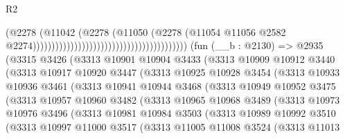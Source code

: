 \begin{lexlean}{R2}
\begin{coremodule}
                                                                          (@2278
                                                                            (@11042
                                                                              (@2278
                                                                                (@11050
                                                                                  (@2278
                                                                                    (@11054
                                                                                      @11056
                                                                                      @2582
                                                                                      @2274)))))))))))))))))))))))))))))))))))))))))
    (fun (__b : @2130) =>
    @2935
      (@3315
        @3426
        (@3313
          @10901
          @10904
          @3433
          (@3313
            @10909
            @10912
            @3440
            (@3313
              @10917
              @10920
              @3447
              (@3313
                @10925
                @10928
                @3454
                (@3313
                  @10933
                  @10936
                  @3461
                  (@3313
                    @10941
                    @10944
                    @3468
                    (@3313
                      @10949
                      @10952
                      @3475
                      (@3313
                        @10957
                        @10960
                        @3482
                        (@3313
                          @10965
                          @10968
                          @3489
                          (@3313
                            @10973
                            @10976
                            @3496
                            (@3313
                              @10981
                              @10984
                              @3503
                              (@3313
                                @10989
                                @10992
                                @3510
                                (@3313
                                  @10997
                                  @11000
                                  @3517
                                  (@3313
                                    @11005
                                    @11008
                                    @3524
                                    (@3313
                                      @11013

\end{coremodule}
\end{lexlean}

